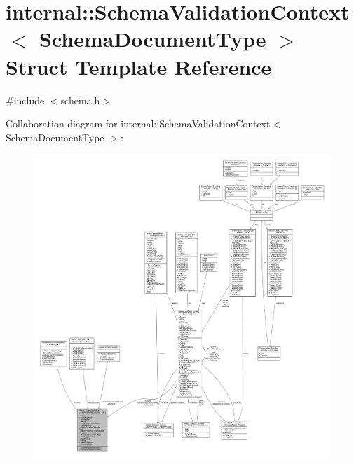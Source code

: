 \hypertarget{structinternal_1_1SchemaValidationContext}{}\section{internal\+:\+:Schema\+Validation\+Context$<$ Schema\+Document\+Type $>$ Struct Template Reference}
\label{structinternal_1_1SchemaValidationContext}


{\ttfamily \#include $<$schema.\+h$>$}



Collaboration diagram for internal\+:\+:Schema\+Validation\+Context$<$ Schema\+Document\+Type $>$\+:
\nopagebreak
\begin{figure}[H]
\begin{center}
\leavevmode
\includegraphics[width=350pt]{structinternal_1_1SchemaValidationContext__coll__graph}
\end{center}
\end{figure}

